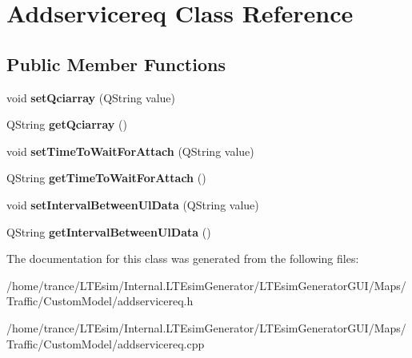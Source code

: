 \hypertarget{class_addservicereq}{}\section{Addservicereq Class Reference}
\label{class_addservicereq}
\subsection*{Public Member Functions}
\begin{DoxyCompactItemize}
\item 
void {\bfseries set\+Qciarray} (Q\+String value)\hypertarget{class_addservicereq_a9faf4cb46ceadef2ab09689834abb8ab}{}\label{class_addservicereq_a9faf4cb46ceadef2ab09689834abb8ab}

\item 
Q\+String {\bfseries get\+Qciarray} ()\hypertarget{class_addservicereq_a0ec9ab2635ad76520a816e06821d1171}{}\label{class_addservicereq_a0ec9ab2635ad76520a816e06821d1171}

\item 
void {\bfseries set\+Time\+To\+Wait\+For\+Attach} (Q\+String value)\hypertarget{class_addservicereq_a049ec8092ae989d948be6b4f77f68aa2}{}\label{class_addservicereq_a049ec8092ae989d948be6b4f77f68aa2}

\item 
Q\+String {\bfseries get\+Time\+To\+Wait\+For\+Attach} ()\hypertarget{class_addservicereq_a6a4f6882c87747b145eed765b75bde21}{}\label{class_addservicereq_a6a4f6882c87747b145eed765b75bde21}

\item 
void {\bfseries set\+Interval\+Between\+Ul\+Data} (Q\+String value)\hypertarget{class_addservicereq_a3f461ef967f7225d24d577865559a35b}{}\label{class_addservicereq_a3f461ef967f7225d24d577865559a35b}

\item 
Q\+String {\bfseries get\+Interval\+Between\+Ul\+Data} ()\hypertarget{class_addservicereq_a7b7d70d7871b269a24905b82de14f8c4}{}\label{class_addservicereq_a7b7d70d7871b269a24905b82de14f8c4}

\end{DoxyCompactItemize}


The documentation for this class was generated from the following files\+:\begin{DoxyCompactItemize}
\item 
/home/trance/\+L\+T\+Esim/\+Internal.\+L\+T\+Esim\+Generator/\+L\+T\+Esim\+Generator\+G\+U\+I/\+Maps/\+Traffic/\+Custom\+Model/addservicereq.\+h\item 
/home/trance/\+L\+T\+Esim/\+Internal.\+L\+T\+Esim\+Generator/\+L\+T\+Esim\+Generator\+G\+U\+I/\+Maps/\+Traffic/\+Custom\+Model/addservicereq.\+cpp\end{DoxyCompactItemize}
